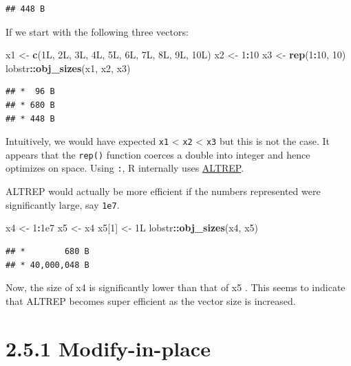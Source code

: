 \documentclass[]{book}
\newenvironment{Shaded}{\begin{snugshade}}{\end{snugshade}}
\newcommand{\DecValTok}[1]{\textcolor[rgb]{0.00,0.00,0.81}{#1}}
\newcommand{\FloatTok}[1]{\textcolor[rgb]{0.00,0.00,0.81}{#1}}
\newcommand{\KeywordTok}[1]{\textcolor[rgb]{0.13,0.29,0.53}{\textbf{#1}}}
\newcommand{\NormalTok}[1]{#1}
\newcommand{\OperatorTok}[1]{\textcolor[rgb]{0.81,0.36,0.00}{\textbf{#1}}}
\newcommand{\StringTok}[1]{\textcolor[rgb]{0.31,0.60,0.02}{#1}}
\begin{document}
\begin{verbatim}
## 448 B
\end{verbatim}

If we start with the following three vectors:

\begin{Shaded}
\begin{Highlighting}[]
\NormalTok{x1 <-}\StringTok{ }\KeywordTok{c}\NormalTok{(1L, 2L, 3L, 4L, 5L, 6L, 7L, 8L, 9L, 10L)}
\NormalTok{x2 <-}\StringTok{ }\DecValTok{1}\OperatorTok{:}\DecValTok{10}
\NormalTok{x3 <-}\StringTok{ }\KeywordTok{rep}\NormalTok{(}\DecValTok{1}\OperatorTok{:}\DecValTok{10}\NormalTok{, }\DecValTok{10}\NormalTok{)}
\NormalTok{lobstr}\OperatorTok{::}\KeywordTok{obj_sizes}\NormalTok{(x1, x2, x3)}
\end{Highlighting}
\end{Shaded}

\begin{verbatim}
## *  96 B
## * 680 B
## * 448 B
\end{verbatim}

Intuitively, we would have expected \texttt{x1} \textless{} \texttt{x2} \textless{} \texttt{x3} but this is not the case. It appears that the \texttt{rep()} function coerces a double into integer and hence optimizes on space. Using \texttt{:}, R internally uses \href{https://blog.revolutionanalytics.com/2017/09/altrep-preview.html}{ALTREP}.

ALTREP would actually be more efficient if the numbers represented were significantly large, say \texttt{1e7}.

\begin{Shaded}
\begin{Highlighting}[]
\NormalTok{x4 <-}\StringTok{ }\DecValTok{1}\OperatorTok{:}\FloatTok{1e7}
\NormalTok{x5 <-}\StringTok{ }\NormalTok{x4}
\NormalTok{x5[}\DecValTok{1}\NormalTok{] <-}\StringTok{ }\NormalTok{1L}
\NormalTok{lobstr}\OperatorTok{::}\KeywordTok{obj_sizes}\NormalTok{(x4, x5)}
\end{Highlighting}
\end{Shaded}

\begin{verbatim}
## *        680 B
## * 40,000,048 B
\end{verbatim}

Now, the size of x4 is significantly lower than that of x5 . This seems to indicate that ALTREP becomes super efficient as the vector size is increased.

\hypertarget{modify-in-place}{%
\section*{2.5.1 Modify-in-place}\label{modify-in-place}}
\end{document}

